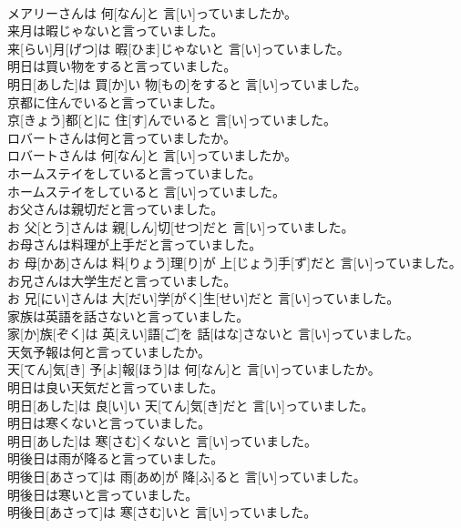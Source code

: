 \documentclass[8pt]{extreport}
\begin{document}
\begin{CJK}{UTF8}{min}
\\	メアリーさんは 何[なん]と 言[い]っていましたか。
\\	来月は暇じゃないと言っていました。	
\\	来[らい]月[げつ]は 暇[ひま]じゃないと 言[い]っていました。
\\	明日は買い物をすると言っていました。	
\\	明日[あした]は 買[か]い 物[もの]をすると 言[い]っていました。
\\	京都に住んでいると言っていました。	
\\	京[きょう]都[と]に 住[す]んでいると 言[い]っていました。
\\	ロバートさんは何と言っていましたか。	
\\	ロバートさんは 何[なん]と 言[い]っていましたか。
\\	ホームステイをしていると言っていました。	
\\	ホームステイをしていると 言[い]っていました。
\\	お父さんは親切だと言っていました。	
\\	お 父[とう]さんは 親[しん]切[せつ]だと 言[い]っていました。
\\	お母さんは料理が上手だと言っていました。	
\\	お 母[かあ]さんは 料[りょう]理[り]が 上[じょう]手[ず]だと 言[い]っていました。
\\	お兄さんは大学生だと言っていました。	
\\	お 兄[にい]さんは 大[だい]学[がく]生[せい]だと 言[い]っていました。
\\	家族は英語を話さないと言っていました。	
\\	家[か]族[ぞく]は 英[えい]語[ご]を 話[はな]さないと 言[い]っていました。
\\	天気予報は何と言っていましたか。	
\\	天[てん]気[き] 予[よ]報[ほう]は 何[なん]と 言[い]っていましたか。
\\	明日は良い天気だと言っていました。	
\\	明日[あした]は 良[い]い 天[てん]気[き]だと 言[い]っていました。
\\	明日は寒くないと言っていました。	
\\	明日[あした]は 寒[さむ]くないと 言[い]っていました。
\\	明後日は雨が降ると言っていました。	
\\	明後日[あさって]は 雨[あめ]が 降[ふ]ると 言[い]っていました。
\\	明後日は寒いと言っていました。	
\\	明後日[あさって]は 寒[さむ]いと 言[い]っていました。

\end{CJK}
\end{document}

